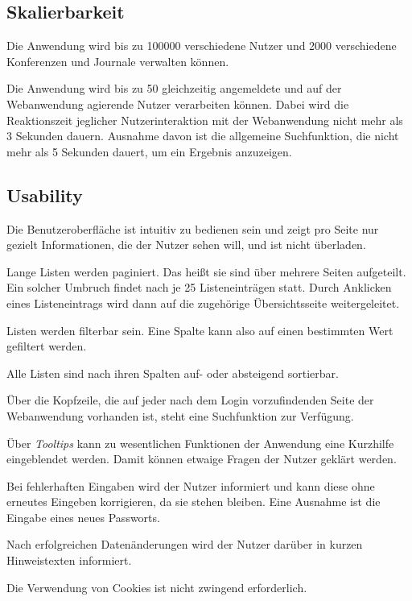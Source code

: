 
\subsection{Skalierbarkeit}

\begin{description}

	 Die Anwendung wird bis zu 100000 verschiedene Nutzer und 2000 verschiedene Konferenzen und Journale verwalten können.

	 Die Anwendung wird bis zu 50 gleichzeitig angemeldete und auf der Webanwendung agierende Nutzer verarbeiten können. Dabei wird die Reaktionszeit jeglicher Nutzerinteraktion mit der Webanwendung nicht mehr als 3 Sekunden dauern. Ausnahme davon ist die allgemeine Suchfunktion, die nicht mehr als 5 Sekunden dauert, um ein Ergebnis anzuzeigen.

\end{description}

\subsection{Usability}

\begin{description}
	 Die Benutzeroberfläche ist intuitiv zu bedienen sein und zeigt pro Seite nur gezielt Informationen, die der Nutzer sehen will, und ist nicht überladen.

	 Lange Listen werden paginiert. Das heißt sie sind über mehrere Seiten aufgeteilt. Ein solcher Umbruch findet nach je 25 Listeneinträgen statt. Durch Anklicken eines Listeneintrags wird dann auf die zugehörige Übersichtsseite weitergeleitet.

	 Listen werden filterbar sein. Eine Spalte kann also auf einen bestimmten Wert gefiltert werden.

	 Alle Listen sind nach ihren Spalten auf- oder absteigend sortierbar.

	 Über die Kopfzeile, die auf jeder nach dem Login vorzufindenden Seite der Webanwendung
	vorhanden ist, steht eine Suchfunktion zur Verfügung.

	 Über \emph{Tooltips} kann zu wesentlichen Funktionen der Anwendung eine Kurzhilfe eingeblendet werden. Damit können etwaige Fragen der Nutzer geklärt werden.

	 Bei fehlerhaften Eingaben wird der Nutzer informiert und kann diese ohne erneutes Eingeben korrigieren, da sie stehen bleiben. Eine Ausnahme ist die Eingabe eines neues Passworts.

	 Nach erfolgreichen Datenänderungen wird der Nutzer darüber in kurzen Hinweistexten informiert.

	 Die Verwendung von Cookies ist nicht zwingend erforderlich.
\end{description}

